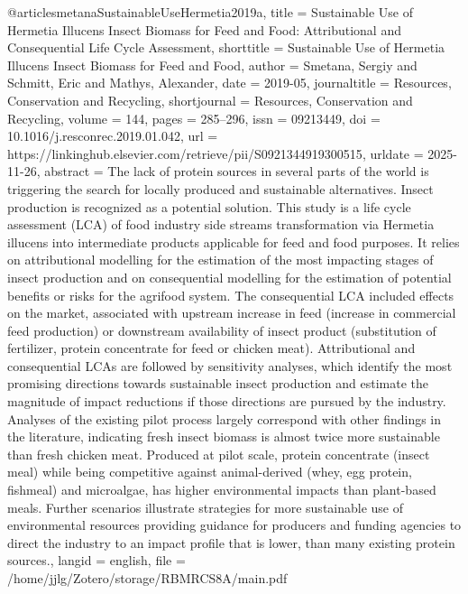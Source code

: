 {{{{@article{smetanaSustainableUseHermetia2019a,
  title = {Sustainable Use of {{Hermetia}} Illucens Insect Biomass for Feed and Food: {{Attributional}} and Consequential Life Cycle Assessment},
  shorttitle = {Sustainable Use of {{Hermetia}} Illucens Insect Biomass for Feed and Food},
  author = {Smetana, Sergiy and Schmitt, Eric and Mathys, Alexander},
  date = {2019-05},
  journaltitle = {Resources, Conservation and Recycling},
  shortjournal = {Resources, Conservation and Recycling},
  volume = {144},
  pages = {285--296},
  issn = {09213449},
  doi = {10.1016/j.resconrec.2019.01.042},
  url = {https://linkinghub.elsevier.com/retrieve/pii/S0921344919300515},
  urldate = {2025-11-26},
  abstract = {The lack of protein sources in several parts of the world is triggering the search for locally produced and sustainable alternatives. Insect production is recognized as a potential solution. This study is a life cycle assessment (LCA) of food industry side streams transformation via Hermetia illucens into intermediate products applicable for feed and food purposes. It relies on attributional modelling for the estimation of the most impacting stages of insect production and on consequential modelling for the estimation of potential benefits or risks for the agrifood system. The consequential LCA included effects on the market, associated with upstream increase in feed (increase in commercial feed production) or downstream availability of insect product (substitution of fertilizer, protein concentrate for feed or chicken meat). Attributional and consequential LCAs are followed by sensitivity analyses, which identify the most promising directions towards sustainable insect production and estimate the magnitude of impact reductions if those directions are pursued by the industry. Analyses of the existing pilot process largely correspond with other findings in the literature, indicating fresh insect biomass is almost twice more sustainable than fresh chicken meat. Produced at pilot scale, protein concentrate (insect meal) while being competitive against animal-derived (whey, egg protein, fishmeal) and microalgae, has higher environmental impacts than plant-based meals. Further scenarios illustrate strategies for more sustainable use of environmental resources providing guidance for producers and funding agencies to direct the industry to an impact profile that is lower, than many existing protein sources.},
  langid = {english},
  file = {/home/jjlg/Zotero/storage/RBMRCS8A/main.pdf}
}

}}}}
